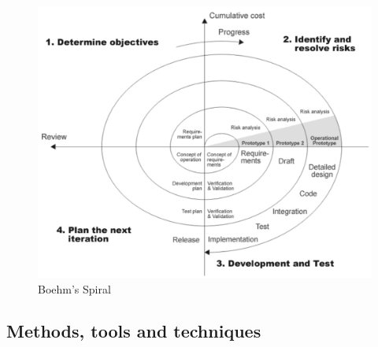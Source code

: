\documentclass[12pt]{article}
\begin{document}
\begin{figure}
	\includegraphics[width=350pt]{BoehmSpiral.pdf}
	\caption{Boehm's Spiral}
\end{figure}

\subsection{Methods, tools and
techniques}\label{methods-tools-and-techniques}
\end{document}
